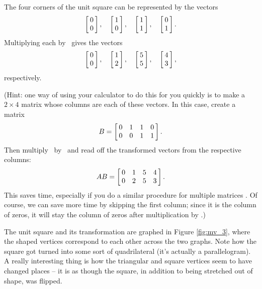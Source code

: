 {The four corners of the unit square can be represented by the vectors $$\bmx{c}0\\0\emx, \quad \bmx{c}1\\0\emx,\quad \bmx{c}1\\1\emx,\quad \bmx{c}0\\1\emx.$$ Multiplying each by \tta\ gives the vectors $$\bmx{c}0\\0\emx,\quad \bmx{c} 1\\2\emx,\quad\bmx{c}5\\5\emx,\quad \bmx{c}4\\3\emx,$$ respectively. 


(Hint: one way of using your calculator to do this for you quickly is to make a $2\times 4$ matrix whose columns are each of these vectors. In this case, create a matrix $$\ttb = \bmx{cccc}0&1&1&0\\0&0&1&1\emx.$$ Then multiply \ttb\ by \tta\ and read off the transformed vectors from the respective columns: $$\tta\ttb = \bmx{cccc}0&1&5&4\\0&2&5&3\emx.$$ This saves time, especially if you do a similar procedure for multiple matrices \tta. Of course, we can save more time by skipping the first column; since it is the column of zeros, it will stay the column of zeros after multiplication by \tta.)

The unit square and its transformation are graphed in Figure \ref{fig:mv_3}, where the shaped vertices correspond to each other across the two graphs. Note how the square got turned into some sort of quadrilateral (it's actually a parallelogram). A really interesting thing is how the triangular and square vertices seem to have changed places -- it is as though the square, in addition to being stretched out of shape, was flipped. 
%
%
%
\begin{myfigure}
\begin{center}
\end{center}
\end{myfigure}}
